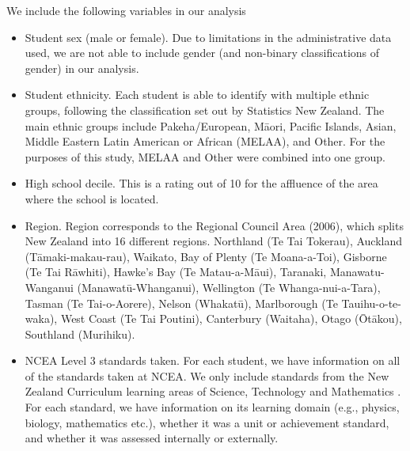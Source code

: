 \documentclass[a4paper]{article}
\begin{document}
We include the following variables in our analysis
\begin{itemize}
    \item Student sex (male or female). Due to limitations in the administrative data used, we are not able to include gender (and non-binary classifications of gender) in our analysis.
    \item Student ethnicity. Each student is able to identify with multiple ethnic groups, following the classification set out by Statistics New Zealand. The main ethnic groups include Pakeha/European, M\={a}ori, Pacific Islands, Asian, Middle Eastern Latin American or African (MELAA), and Other. For the purposes of this study, MELAA and Other were combined into one group.
    \item High school decile. This is a rating out of 10 for the affluence of the area where the school is located. 
    \item Region. Region corresponds to the Regional Council Area (2006), which splits New Zealand into 16 different regions. Northland (Te Tai Tokerau), Auckland (T\={a}maki-makau-rau), Waikato, Bay of Plenty (Te Moana-a-Toi), Gisborne (Te Tai R\={a}whiti), Hawke's Bay (Te Matau-a-M\={a}ui), Taranaki, Manawatu-Wanganui (Manawat\={u}-Whanganui), Wellington (Te Whanga-nui-a-Tara), Tasman (Te Tai-o-Aorere), Nelson (Whakat\={u}), Marlborough (Te Tauihu-o-te-waka), West Coast (Te Tai Poutini), Canterbury (Waitaha), Otago (\={O}t\={a}kou), Southland (Murihiku).
    \item NCEA Level 3 standards taken. For each student, we have information on all of the standards taken at NCEA. We only include standards from the New Zealand Curriculum learning areas of Science, Technology and Mathematics \cite{NZCurriculum2007}. For each standard, we have information on its learning domain (e.g., physics, biology, mathematics etc.), whether it was a unit or achievement standard, and whether it was assessed internally or externally.
\end{itemize}
\end{document}
